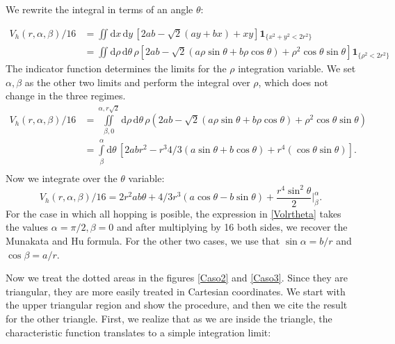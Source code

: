 \documentclass[superscriptaddress,pre,reprint,showpacs,twocolumn]{revtex4-1}
\newcommand{\rd}[1]{\mathrm{d}{#1} \,}
\newcommand{\indicatorsymbol}{\mathbf{1}}
\newcommand{\indicator}[1]{\indicatorsymbol_{ \{   #1 \} } }
\begin{document}
We rewrite the integral in terms of an angle $\theta$:

\begin{equation}\label{Vhatch1}
\begin{split}
V_h(r,\alpha,\beta)/16 &=
\iint \rd x \rd y \left[ 2ab-\sqrt{2}(ay+bx)+x y \right]
\indicator{x^2 + y^2 < 2r^2}\\
&=
\iint \rd \rho \rd \theta \rho 
\left[ 2ab -\sqrt{2}(a\rho\sin\theta+b\rho\cos\theta) +\rho^2 \cos\theta\sin\theta \right]
\indicator{\rho^2<2r^2 }
\end{split}
\end{equation}
The indicator function determines the limits for the $\rho$ integration variable.
We set $\alpha, \beta$ as the other two limits and perform the
integral over $\rho$,  which does not change in the three regimes.
\begin{equation}
  \begin{split}
 V_h(r,\alpha,\beta)/16 &=\iint\limits_{\beta,0}^{\alpha,r\sqrt{2}} \rd \rho \rd \theta \rho (2ab
-\sqrt{2}(a\rho\sin\theta+b\rho\cos\theta)
+\rho^2 \cos\theta\sin\theta)\\
 &=\int\limits_\beta^{\alpha}  \rd \theta  
\left[ 2abr^2 - r^3 4/3 (a\sin\theta+b\cos\theta)+r^4 (\cos\theta\sin\theta) \right].\\
\end{split}
  \end{equation}
Now we integrate over the $\theta$ variable:
\begin{equation}\label{Volrtheta}
  V_h(r,\alpha,\beta)/16 = 2r^2ab\theta
  +4/3r^3(a\cos\theta-b\sin\theta)
  +\frac{r^4 \sin^2\theta}{2} \Bigg\vert_\beta^\alpha.
\end{equation}
For the case in which all hopping is posible, the expression in \eqref{Volrtheta}
takes the values $\alpha=\pi/2, \beta=0$ and after multiplying by 16 both sides,
we recover the Munakata and Hu formula. For the other two cases, we use that
$\sin \alpha = b / r$ and $\cos \beta = a / r$.




Now we treat the dotted areas in the figures \ref{Caso2} and \ref{Caso3}. Since they are triangular, they
are more easily treated in Cartesian coordinates. We start with the upper
triangular region
and show the procedure, and then we cite the result for the
other triangle.
First, we realize that as we are inside the triangle, the characteristic function
translates to a simple integration limit:
\end{document}
